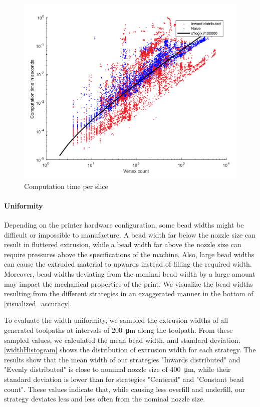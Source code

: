 \begin{figure}
\includegraphics[width=\columnwidth]{sources/validation/computime2.pdf}
\caption{Computation time per slice}
\label{computime}
\end{figure}


\paragraph{Uniformity}
Depending on the printer hardware configuration, some bead widths might be difficult or impossible to manufacture.
A bead width far below the nozzle size can result in fluttered extrusion, while a bead width far above the nozzle size can require pressures above the specifications of the machine. 
Also, large bead widths can cause the extruded material to upwards instead of filling the required width.
Moreover, bead widths deviating from the nominal bead width by a large amount may impact the mechanical properties of the print.
We visualize the bead widths resulting from the different strategies in an exaggerated manner in the bottom of \cref{visualized_accuracy}.

To evaluate the width uniformity, we sampled the extrusion widths of all generated toolpaths 
at intervals of \SI{200}{\micro\meter} along the toolpath.
From these sampled values, we calculated the mean bead width, and standard deviation.
\cref{widthHistogram} shows the distribution of extrusion width for each strategy.
The results show that the mean width of our strategies "Inwards distributed" and "Evenly distributed" is close to nominal nozzle size of \SI{400}{\micro\meter}, while their standard deviation is lower than for strategies "Centered" and "Constant bead count". 
These values indicate that, while causing less overfill and underfill, our strategy deviates less and less often from the nominal nozzle size.

